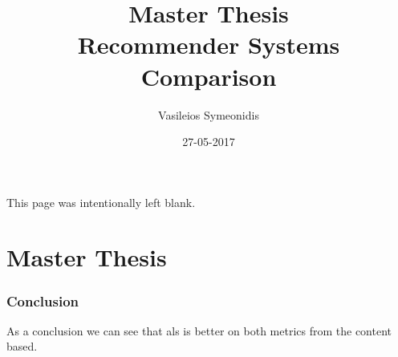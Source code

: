 \documentclass{article}
\title{Master Thesis \\ Recommender Systems Comparison}
\date{27-05-2017}
\author{Vasileios Symeonidis}
\begin{document}

\maketitle
{}
\newpage
\tableofcontents
{}
\newpage
{}
\begin{center}
This page was intentionally left blank.
\end{center}
\newpage
{}

\part{Master Thesis}





\newpage
\section{Conclusion}
As a conclusion we can see that als is better on both metrics from the content based.

\newpage



\newpage








%	
%	
\end{document}
